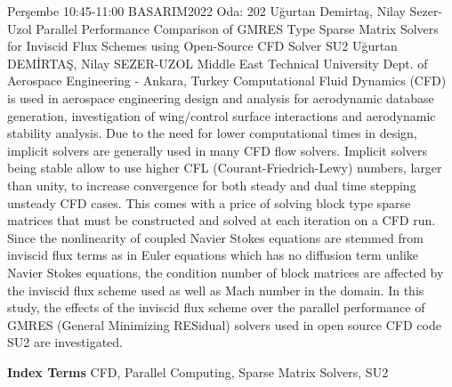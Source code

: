 
    \begin{abstract_basarim}
    {Perşembe 10:45-11:00}
    {BASARIM2022}
    {Oda: 202}
    {Uğurtan Demirtaş, Nilay Sezer-Uzol}
    {Parallel Performance Comparison of GMRES Type Sparse Matrix Solvers for Inviscid Flux Schemes using Open-Source CFD Solver SU2}
    {%
    Uğurtan DEMİRTAŞ, Nilay SEZER-UZOL}
    {%
    }
    {%
    Middle East Technical University Dept. of Aerospace Engineering - Ankara, Turkey}
    Computational Fluid Dynamics (CFD) is used in aerospace engineering design and analysis for aerodynamic database generation, investigation of wing/control surface interactions and aerodynamic stability analysis. Due to the need for lower computational times in design, implicit solvers are generally used in many CFD flow solvers. Implicit solvers being stable allow to use higher CFL (Courant-Friedrich-Lewy) numbers, larger than unity, to increase convergence for both steady and dual time stepping unsteady CFD cases. This comes with a price of solving block type sparse matrices that must be constructed and solved at each iteration on a CFD run. Since the nonlinearity of coupled Navier Stokes equations are stemmed from inviscid flux terms as in Euler equations which has no diffusion term unlike Navier Stokes equations, the condition number of block matrices are affected by the inviscid flux scheme used as well as Mach number in the domain. In this study, the effects of the inviscid flux scheme over the parallel performance of GMRES (General Minimizing RESidual) solvers used in open source CFD code SU2 are investigated. 
    
            \textbf{Index Terms} \newline{}CFD, Parallel Computing, Sparse Matrix Solvers, SU2
    \end{abstract_basarim}
    